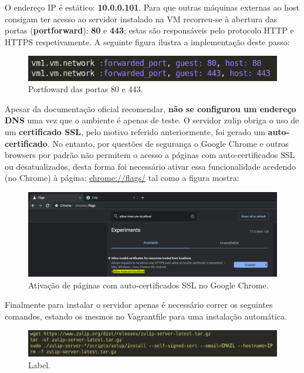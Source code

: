 \documentclass[11pt,a4paper]{report}%
\begin{document}
O endereço IP é estático: \textbf{10.0.0.101}. Para que outras máquinas externas ao host consigam ter acesso ao servidor instalado na VM recorreu-se à abertura das portas (\textbf{portforward}):  \textbf{80} e  \textbf{443}; estas são responsáveis pelo protocolo HTTP e HTTPS respetivamente. A seguinte figura ilustra a implementação deste passo:

\begin{figure}[H]
	\centering
	\includegraphics[scale=0.6]{portfoward.png}
	\caption{Portfoward das portas 80 e 443.}
	\label{img:pag}
\end{figure}

Apesar da documentação oficial recomendar, \textbf{não se configurou um endereço DNS} uma vez que o ambiente é apenas de teste.
O servidor zulip obriga o uso de um \textbf{certificado SSL}, pelo motivo referido anteriormente, foi gerado um \textbf{auto-certificado}. No entanto, por questões de segurança o Google Chrome e outros browsers por padrão não permitem o acesso a páginas com auto-certificados SSL ou desatualizados, desta forma foi necessário ativar essa funcionalidade acedendo (no Chrome) à página: \url{chrome://flags/} tal como a figura mostra: 

\begin{figure}[H]
	\centering
	\includegraphics[scale=0.35]{allow_ssl_localhost.png}
	\caption{Ativação de páginas com auto-certificados SSL no Google Chrome.}
	\label{img:pag}
\end{figure}

Finalmente para instalar o servidor apenas é necessário correr os seguintes comandos, estando os mesmos no Vagrantfile para uma instalação automática.

\begin{figure}[H]
	\centering
	\includegraphics[scale=0.5]{install_zulip.png}
	\caption{Label.}
	\label{img:pag}
\end{figure}
\end{document}
